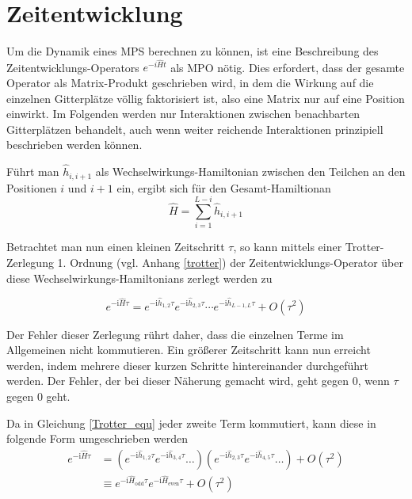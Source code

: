 \documentclass[10pt,a4paper]{report}
\begin{document}
\section{Zeitentwicklung}\label{tMPS}

Um die Dynamik eines MPS berechnen zu können, ist eine Beschreibung des Zeitentwicklungs-Operators $e^{-i\hat{H}t}$ als MPO nötig. Dies erfordert, dass der gesamte Operator als Matrix-Produkt geschrieben wird, in dem die Wirkung auf die einzelnen Gitterplätze völlig faktorisiert ist, also eine Matrix nur auf eine Position einwirkt. Im Folgenden werden nur Interaktionen zwischen benachbarten Gitterplätzen behandelt, auch wenn weiter reichende Interaktionen prinzipiell beschrieben werden können.

Führt man $\hat{h}_{i,i+1}$ als Wechselwirkungs-Hamiltonian zwischen den Teilchen an den Positionen $i$ und $i+1$ ein, ergibt sich für den Gesamt-Hamiltionan
\begin{equation}
\hat{H}=\sum_{i=1}^{L-i}\hat{h}_{i,i+1}
\end{equation}

Betrachtet man nun einen kleinen Zeitschritt $\tau$, so kann mittels einer Trotter-Zerlegung 1. Ordnung (vgl. Anhang \ref{trotter}) der Zeitentwicklungs-Operator über diese Wechselwirkungs-Hamiltonians zerlegt werden zu

\begin{equation}\label{Trotter_equ}
e^{-\text{i}\hat{H}\tau}= e^{-\text{i}\hat{h}_{1,2}\tau}e^{-\text{i}\hat{h}_{2,3}\tau}\cdots e^{-\text{i}\hat{h}_{L-1,L}\tau}+O(\tau^2)
\end{equation}

Der Fehler dieser Zerlegung rührt daher, dass die einzelnen Terme im Allgemeinen nicht kommutieren. Ein größerer Zeitschritt kann nun erreicht werden, indem mehrere dieser kurzen Schritte hintereinander durchgeführt werden. Der Fehler, der bei dieser Näherung gemacht wird, geht gegen $0$, wenn $\tau$ gegen $0$ geht.

Da in Gleichung \ref{Trotter_equ} jeder zweite Term kommutiert, kann diese in folgende Form umgeschrieben werden
\begin{equation}
\begin{split}
e^{-\text{i}\hat{H}\tau}&=(e^{-\text{i}\hat{h}_{1,2}\tau}e^{-\text{i}\hat{h}_{3,4}\tau}\ldots)(e^{-\text{i}\hat{h}_{2,3}\tau}e^{-\text{i}\hat{h}_{4,5}\tau}\ldots)+O(\tau^2)\\
&\equiv e^{-\text{i}\hat{H}_{\text{odd}}\tau}e^{-\text{i}\hat{H}_{\text{even}}\tau}+O(\tau^2)
\end{split}
\end{equation}
\end{document}
